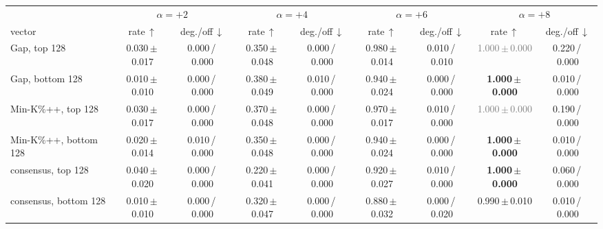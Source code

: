 \begin{tabular}{@{}lcccccccc@{}}
\toprule
& \multicolumn{2}{c}{$\alpha=+2$} & \multicolumn{2}{c}{$\alpha=+4$} & \multicolumn{2}{c}{$\alpha=+6$} & \multicolumn{2}{c}{$\alpha=+8$} \\
\cmidrule(lr){2-3}\cmidrule(lr){4-5}\cmidrule(lr){6-7}\cmidrule(lr){8-9}
vector & rate\,$\uparrow$ & deg./off\,$\downarrow$ & rate\,$\uparrow$ & deg./off\,$\downarrow$ & rate\,$\uparrow$ & deg./off\,$\downarrow$ & rate\,$\uparrow$ & deg./off\,$\downarrow$ \\
\midrule
Gap, top 128 & 0.030\,{\scriptsize$\pm$\,0.017} & {\scriptsize 0.000\,/\,0.000} & 0.350\,{\scriptsize$\pm$\,0.048} & {\scriptsize 0.000\,/\,0.000} & 0.980\,{\scriptsize$\pm$\,0.014} & {\scriptsize 0.010\,/\,0.010} & \textcolor{gray}{1.000\,{\scriptsize$\pm$\,0.000}} & {\scriptsize 0.220\,/\,0.000} \\
Gap, bottom 128 & 0.010\,{\scriptsize$\pm$\,0.010} & {\scriptsize 0.000\,/\,0.000} & 0.380\,{\scriptsize$\pm$\,0.049} & {\scriptsize 0.010\,/\,0.000} & 0.940\,{\scriptsize$\pm$\,0.024} & {\scriptsize 0.000\,/\,0.000} & \textbf{1.000\,{\scriptsize$\pm$\,0.000}} & {\scriptsize 0.010\,/\,0.000} \\
Min-K\%++, top 128 & 0.030\,{\scriptsize$\pm$\,0.017} & {\scriptsize 0.000\,/\,0.000} & 0.370\,{\scriptsize$\pm$\,0.048} & {\scriptsize 0.000\,/\,0.000} & 0.970\,{\scriptsize$\pm$\,0.017} & {\scriptsize 0.010\,/\,0.000} & \textcolor{gray}{1.000\,{\scriptsize$\pm$\,0.000}} & {\scriptsize 0.190\,/\,0.000} \\
Min-K\%++, bottom 128 & 0.020\,{\scriptsize$\pm$\,0.014} & {\scriptsize 0.010\,/\,0.000} & 0.350\,{\scriptsize$\pm$\,0.048} & {\scriptsize 0.000\,/\,0.000} & 0.940\,{\scriptsize$\pm$\,0.024} & {\scriptsize 0.000\,/\,0.000} & \textbf{1.000\,{\scriptsize$\pm$\,0.000}} & {\scriptsize 0.010\,/\,0.000} \\
consensus, top 128 & 0.040\,{\scriptsize$\pm$\,0.020} & {\scriptsize 0.000\,/\,0.000} & 0.220\,{\scriptsize$\pm$\,0.041} & {\scriptsize 0.000\,/\,0.000} & 0.920\,{\scriptsize$\pm$\,0.027} & {\scriptsize 0.010\,/\,0.000} & \textbf{1.000\,{\scriptsize$\pm$\,0.000}} & {\scriptsize 0.060\,/\,0.000} \\
consensus, bottom 128 & 0.010\,{\scriptsize$\pm$\,0.010} & {\scriptsize 0.000\,/\,0.000} & 0.320\,{\scriptsize$\pm$\,0.047} & {\scriptsize 0.000\,/\,0.000} & 0.880\,{\scriptsize$\pm$\,0.032} & {\scriptsize 0.000\,/\,0.020} & 0.990\,{\scriptsize$\pm$\,0.010} & {\scriptsize 0.010\,/\,0.000} \\

\end{tabular}
